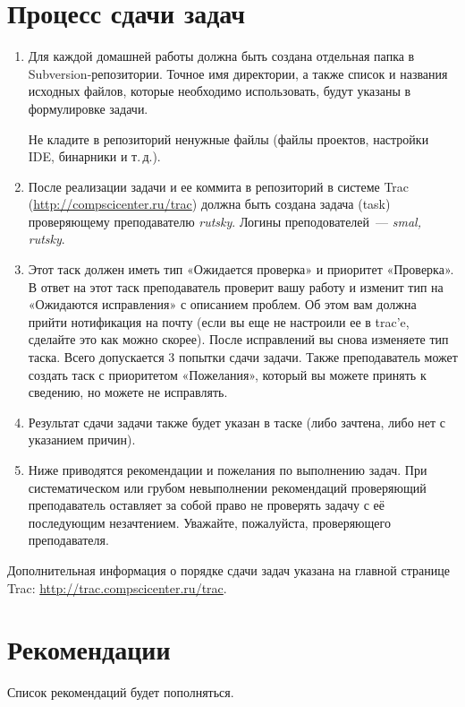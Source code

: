 \documentclass[a4paper,10pt]{article}
\begin{document}
\section{Процесс сдачи задач}
    \begin{enumerate}
    \item Для каждой домашней работы должна быть создана отдельная папка в Subversion-репозитории.
        Точное имя директории, а также список и названия исходных файлов, которые необходимо использовать, будут указаны в формулировке задачи.

        Не кладите в репозиторий ненужные файлы (файлы проектов, настройки IDE,
        бинарники и т.\,д.).

    \item После реализации задачи и ее коммита в репозиторий в системе Trac
        (\url{http://compscicenter.ru/trac}) должна быть создана
        задача (task) проверяющему преподавателю {\it rutsky}. Логины преподователей~— {\it smal, rutsky}.
    \item Этот таск должен иметь тип «Ожидается проверка» и приоритет «Проверка». В
        ответ на этот таск преподаватель проверит вашу работу и изменит тип на
        «Ожидаются исправления» с описанием проблем. Об этом вам должна прийти
        нотификация на почту (если вы еще не настроили ее в trac’e, сделайте это как
        можно скорее). После исправлений вы снова изменяете тип таска. Всего
        допускается 3 попытки сдачи задачи. Также преподаватель может создать таск с
        приоритетом «Пожелания», который вы можете принять к сведению, но можете не
        исправлять. 
    \item Результат сдачи задачи также будет указан в таске (либо зачтена, либо нет
        с указанием причин). 
    \item Ниже приводятся рекомендации и пожелания по выполнению задач.
        При систематическом или грубом невыполнении рекомендаций проверяющий преподаватель оставляет за собой право не проверять задачу с её последующим незачтением.
        Уважайте, пожалуйста, проверяющего преподавателя.
\end{enumerate}

Дополнительная информация о порядке сдачи задач указана на главной странице Trac: \url{http://trac.compscicenter.ru/trac}.

\section{Рекомендации}
Список рекомендаций будет пополняться. 
\end{document}
